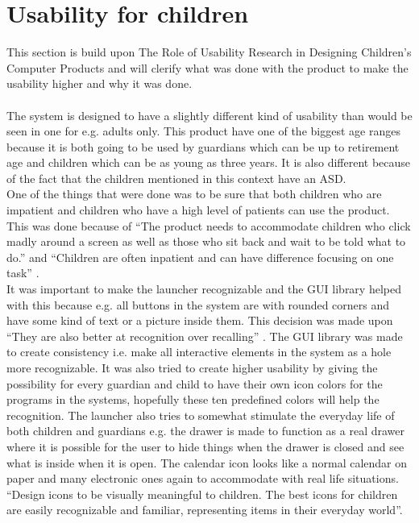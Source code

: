 \section{Usability for children}
This section is build upon {T}he Role of Usability Research in Designing Children’s Computer Products and will clerify what was done with the product to make the usability higher and why it was done.\\\\
The \giraf[] system is designed to have a slightly different kind of usability than would be seen in one for e.g. adults only. This product have one of the biggest age ranges because it is both going to be used by guardians which can be up to retirement age and children which can be as young as three years. It is also different because of the fact that the children mentioned in this context have an ASD.\\
One of the things that were done was to be sure that both children who are impatient and children who have a high level of patients can use the product. This was done because of ``The product needs to accommodate children who click madly around a screen as well as those who sit back and wait to be told what to do.'' \citep{microsoft:usability} and ``Children are often inpatient and can have difference focusing on one task'' \citep{microsoft:usability}.\\
It was important to make the launcher recognizable and the \giraf[] GUI library helped with this because e.g. all buttons in the \giraf[] system are with rounded corners and have some kind of text or a picture inside them. This decision was made upon ``They are also better at recognition over recalling'' \citep{microsoft:usability}. The \giraf[] GUI library was made to create consistency i.e. make all interactive elements in the \giraf[] system as a hole more recognizable. It was also tried to create higher usability by giving the possibility for every guardian and child to have their own icon colors for the programs in the \giraf[] systems, hopefully these ten predefined colors will help the recognition. The launcher also tries to somewhat stimulate the everyday life of both children and guardians e.g. the drawer is made to function as a real drawer where it is possible for the user to hide things when the drawer is closed and see what is inside when it is open. The calendar icon looks like a normal calendar on paper and many electronic ones again to accommodate with real life situations. 
``Design icons to be visually meaningful to children. The best icons for children are easily recognizable and familiar, representing items in their everyday world''\citep{microsoft:usability}.  \\
